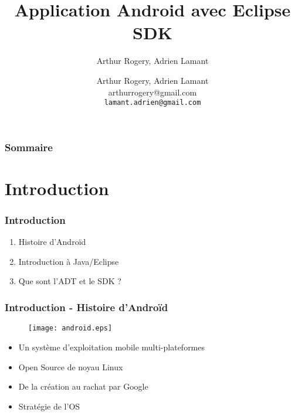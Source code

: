 \documentclass{beamer}
\title[Android Eclipse SDK]{
  Application Android avec Eclipse SDK}
\subtitle{Arthur Rogery, Adrien Lamant}
\author[Arthur Rogery, Adrien Lamant]{
  Arthur Rogery, Adrien Lamant \\\medskip
  {\small \nolinkurl{}{arthurrogery@gmail.com}} \\ 
  {\small \nolinkurl{lamant.adrien@gmail.com}}}
\institute[Application Android Eclipse SDK]{
  Licence informatique, Université Montpellier II}
\date[20/11/2014]{}
\begin{document}
\begin{frame}
  \titlepage
\end{frame}

\begin{frame}
  \frametitle{Sommaire}

  \tableofcontents
\end{frame}



\section{Introduction}

\begin{frame}
  \frametitle{Introduction}
  \begin{enumerate}
    \item Histoire d'Androïd
    \item Introduction à Java/Eclipse
    \item Que sont l'ADT et le SDK ?
  \end{enumerate}
\end{frame}



\begin{frame}
  \frametitle{Introduction - Histoire d'Androïd}
    \begin{figure}
    \centering
    \texttt{[image: android.eps]}
    \end{figure}
    \begin{itemize}
        \item Un système d'exploitation mobile multi-plateformes
        \item Open Source de noyau Linux
        \item De la création au rachat par Google
        \item Stratégie de l'OS
    \end{itemize}
\end{frame}
\end{document}
